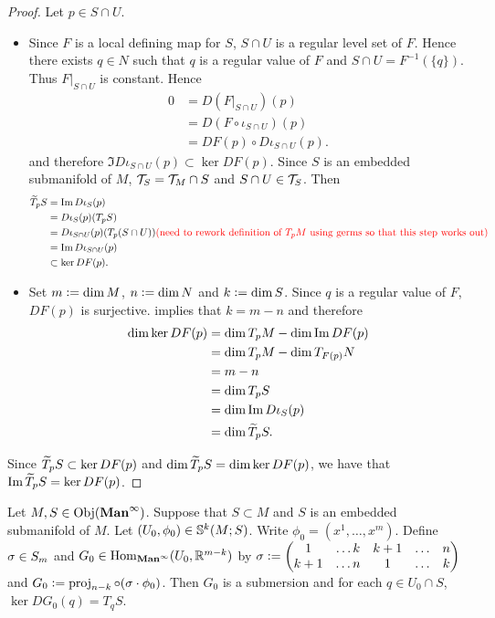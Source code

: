 \documentclass{book}
\begin{document}
	\begin{proof}
		Let $p \in S \cap U$.
		\begin{itemize}
			\item Since $F$ is a local defining map for $S$, $S \cap U$ is a regular level set of $F$. Hence there exists $q \in N$ such that $q$ is a regular value of $F$ and $S \cap U = F^{-1}(\{q\})$. Thus $F|_{S \cap U}$ is constant. Hence
			\begin{align*}
				0
				& = D(F|_{S \cap U})(p) \\
				& = D(F \circ \iota_{S \cap U})(p) \\
				& = DF(p) \circ D \iota_{S \cap U}(p).
			\end{align*} 
			and therefore $\Im D \iota_{S \cap U}(p) \subset \ker DF(p)$. Since $S$ is an embedded submanifold of $M$, $\MT_S = \MT_M \cap S$ and $S \cap U \in \MT_S$. Then
			\begin{align*}
				\wt{T}_pS 
				& = \Im D\iota_S(p) \\
				& = D\iota_S(p)(T_p S) \\
				& = D\iota_{S \cap U}(p)(T_p (S \cap U)) \tcr{\text{(need to rework definition of $T_pM$ using germs so that this step works out)}} \\
				& = \Im D\iota_{S \cap U} (p) \\
				& \subset \ker DF(p).
			\end{align*}
			\item Set $m \defeq \dim M$, $n \defeq \dim N$ and $k \defeq \dim S$. Since $q$ is a regular value of $F$, $DF(p)$ is surjective.  implies that $k = m-n$ and therefore
			\begin{align*}
				\dim \ker DF(p)
				& = \dim T_pM - \dim \Im DF(p) \\
				& = \dim T_pM - \dim T_{F(p)}N \\
				& = m - n \\
				& = \dim T_p S \\
				& = \dim \Im D \iota_S(p) \\
				& = \dim \wt{T}_p S.
			\end{align*}
		\end{itemize}
		Since $\wt{T}_p S \subset \ker DF(p)$ and $\dim \wt{T}_p S = \dim \ker DF(p)$, we have that $\Im \wt{T}_p S = \ker D F(p)$. 
	\end{proof}


	\begin{ex} 
		Let $M, S \in \Obj(\bManinf)$. Suppose that $S \subset M$ and $S$ is an embedded submanifold of $M$. Let $(U_0, \phi_0) \in \S^k(M;S)$. Write $\phi_0 = (x^1, \ldots, x^m)$. Define $\sig \in S_m$ and $G_0 \in \Hom_{\bManinf}(U_0, \R^{m-k})$ by $\sig \defeq 
		\begin{pmatrix}
			1   & \ldots k & k+1 &  \ldots &  n \\
			k+1 & \ldots n & 1   &  \ldots &  k
		\end{pmatrix}$ 
		and $G_0 \defeq  \prj_{n-k} \circ (\sig \cdot \phi_0)$.  Then $G_0$ is a submersion and for each $q \in U_0 \cap S$, $\ker DG_0(q) = T_qS$.
	\end{ex}
\end{document}
